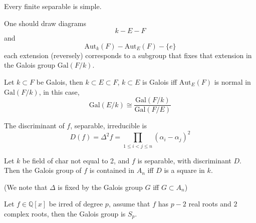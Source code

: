 \documentclass[openany]{book}
\newcommand{\Q}{\mathbb{Q}}
\newcommand{\gal}{\text{Gal}}
\begin{document}
\begin{thm}
    Every finite separable is simple.
\end{thm}

One should draw diagrams 
\begin{equation*}
    k-E-F
\end{equation*}
and 
\begin{equation*}
    \text{Aut}_k(F)-\text{Aut}_E(F)-\{e\}
\end{equation*}
each extension (reversely) corresponds to a subgroup that fixes that extension in the Galois group $\gal(F/k)$.

\begin{thm}
    Let $k\subset F$ be Galois, then $k\subset E\subset F$, $k\subset E$ is Galois iff $\text{Aut}_E(F)$ is normal in $\gal(F/k)$, in this case, 
    \begin{equation*}
        \gal(E/k)\cong\frac{\gal(F/k)}{\gal(F/E)}
    \end{equation*}
\end{thm}


\begin{defn}[discriminant]
    The discriminant of $f$, separable, irreducible is 
    \begin{equation*}
        D(f)=\Delta^2f=\prod_{1\leq i<j\leq n}(\alpha_i-\alpha_j)^2
    \end{equation*}
\end{defn}

\begin{prop}
    Let $k$ be field of char not equal to 2, and $f$ is separable, with discriminant $D$. Then the Galois group of $f$ is contained in $A_n$ iff $D$ is a square in $k$.

    (We note that $\Delta$ is fixed by the Galois group $G$ iff $G\subset A_n$)
\end{prop}

\begin{prop}
    Let $f\in\Q[x]$ be irred of degree $p$, assume that $f$ has $p-2$ real roots and $2$ complex roots, then the Galois group is $S_p$.
\end{prop}
\end{document}
